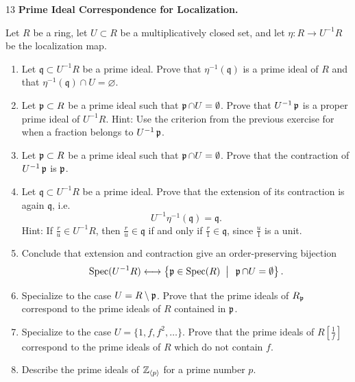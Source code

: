 \documentclass[Notebook.tex]{subfiles}
\begin{document}
\begin{problem}{13}
	\textbf{Prime Ideal Correspondence for Localization.} 
	
	Let $R$ be a ring, let $U\subset R$ be a multiplicatively closed set, and let $\eta:R\to U^{-1}R$ be the localization map.
	\begin{enumerate}
		\item Let $\mathfrak{q}\subset U^{-1}R$ be a prime ideal. Prove that $\eta^{-1}(\mathfrak{q})$ is a prime ideal of $R$ and that $\eta^{-1}(\mathfrak{q})\cap U=\varnothing$.
		\item Let $\operatorname{\mathfrak{p}}\subset R$ be a prime ideal such that $\operatorname{\mathfrak{p}}\cap U=\emptyset$. Prove that $U^{-1}\operatorname{\mathfrak{p}}$ is a proper prime ideal of $U^{-1}R$. Hint: Use the criterion from the previous exercise for when a fraction belongs to $U^{-1}\operatorname{\mathfrak{p}}$.
		\item Let $\operatorname{\mathfrak{p}}\subset R$ be a prime ideal such that $\operatorname{\mathfrak{p}}\cap U=\emptyset$. Prove that the contraction of $U^{-1}\operatorname{\mathfrak{p}}$ is $\operatorname{\mathfrak{p}}$.
		\item Let $\mathfrak{q}\subset U^{-1}R$ be a prime ideal. Prove that the extension of its contraction is again $\mathfrak{q}$, i.e.
		\[
		U^{-1}\eta^{-1}(\mathfrak{q})=\mathfrak{q}.
		\]
		Hint: If $\frac{r}{u}\in U^{-1}R$, then $\frac{r}{u}\in \mathfrak{q}$ if and only if $\frac{r}{1}\in \mathfrak{q}$, since $\frac{u}{1}$ is a unit.
		\item Conclude that extension and contraction give an order-preserving bijection
		\[
		\operatorname{Spec}(U^{-1}R)
		\longleftrightarrow
		\left\{\operatorname{\mathfrak{p}}\in \operatorname{Spec}(R)\;\; \big|\;\; \operatorname{\mathfrak{p}}\cap U=\emptyset\right\}.
		\]
		\item Specialize to the case $U=R\setminus \operatorname{\mathfrak{p}}$. Prove that the prime ideals of $R_{\operatorname{\mathfrak{p}}}$ correspond to the prime ideals of $R$ contained in $\operatorname{\mathfrak{p}}$.
		\item Specialize to the case $U=\{1,f,f^2,\ldots\}$. Prove that the prime ideals of $R[\frac{1}{f}]$ correspond to the prime ideals of $R$ which do not contain $f$.
		\item Describe the prime ideals of $\mathbb Z_{\langle p\rangle}$ for a prime number $p$.
	\end{enumerate}
\end{problem}
\end{document}
